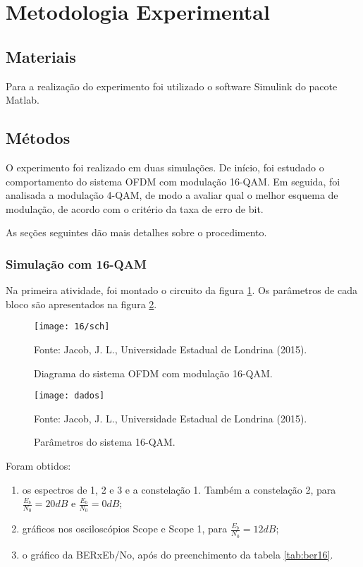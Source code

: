 \newpage
\section{Metodologia Experimental}

\subsection{Materiais}

Para a realização do experimento foi utilizado o software Simulink do pacote 
Matlab.

\subsection{Métodos}
O experimento foi realizado em duas simulações. De início, foi estudado o 
comportamento do sistema OFDM com modulação 16-QAM. Em seguida, foi analisada a modulação 4-QAM, de modo a avaliar qual o melhor esquema de modulação, de acordo com o critério da taxa de erro de bit.

As seções seguintes dão mais detalhes sobre o procedimento.

\subsubsection{Simulação com 16-QAM}
Na primeira atividade, foi montado o circuito da figura \ref{fig:16sch}. Os parâmetros de cada bloco são apresentados na figura \ref{fig:dados}.

\begin{figure}[H]
  \centering
  \caption{Diagrama do sistema OFDM com modulação 16-QAM.}
  \texttt{[image: 16/sch]}
  \label{fig:16sch}
    
  \small Fonte: Jacob, J. L., Universidade Estadual de Londrina (2015).
\end{figure}

\begin{figure}[H]
  \centering
  \caption{Parâmetros do sistema 16-QAM.}
  \texttt{[image: dados]}
  \label{fig:dados}
  
  \small Fonte: Jacob, J. L., Universidade Estadual de Londrina (2015).
\end{figure}

Foram obtidos:

\begin{enumerate}
  \item os espectros de 1, 2 e 3 e a constelação 1. Também a constelação 2, para $\frac{E_b}{N_0} = 20 dB$ e $\frac{E_b}{N_0} = 0 dB$;
  
  \item gráficos nos osciloscópios Scope e Scope 1, para $\frac{E_b}{N_0} = 12 dB$;
  
  \item o gráfico da BERxEb/No, após do preenchimento da tabela \ref{tab:ber16}.
\end{enumerate}

